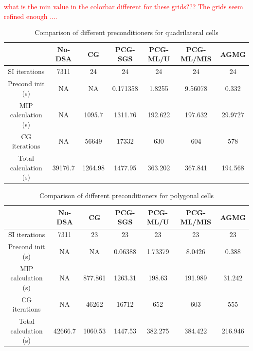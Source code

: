 %
\textcolor{red}{what is the min value in the colorbar different for these grids??? The grids seem refined enough ....}
\begin{table}[!htbp]
  \begin{center}
    \caption{Comparison of different preconditioners for quadrilateral cells}
    \begin{tabular}{|c|c|c|c|c|c|c|}
      \hline
      & No-DSA & CG & PCG-SGS & PCG-ML/U & PCG-ML/MIS & AGMG \\
      \hline
      SI iterations   & 7311    & 24      & 24       & 24      & 24      & 24 \\
   Precond init (s)   & NA      & NA      & 0.171358 & 1.8255  & 9.56078 & 0.332 \\
MIP calculation (s)   & NA      & 1095.7  & 1311.76  & 192.622 & 197.632 & 29.9727 \\
      CG iterations   & NA      & 56649   & 17332    & 630     & 604     & 578 \\
Total calculation (s) & 39176.7 & 1264.98 & 1477.95  & 363.202 & 367.841 &
      194.568 \\
      \hline
    \end{tabular}
    \label{comparison_homog_quad}
  \end{center}
\end{table}
%
\begin{table}[!htbp]
  \begin{center}
    \caption{Comparison of different preconditioners for polygonal cells}
    \begin{tabular}{|c|c|c|c|c|c|c|}
      \hline
      & No-DSA & CG & PCG-SGS & PCG-ML/U & PCG-ML/MIS & AGMG \\
      \hline
      SI iterations   & 7311    & 23      & 23      & 23      & 23      & 23 \\
   Precond init (s)   & NA      & NA      & 0.06388 & 1.73379 & 8.0426  & 0.388 \\
MIP calculation (s)   & NA      & 877.861 & 1263.31 & 198.63  & 191.989 &
      31.242 \\
      CG iterations   & NA      & 46262   & 16712   & 652     & 603     & 555 \\
Total calculation (s) & 42666.7 & 1060.53 & 1447.53 & 382.275 & 384.422 &
      216.946 \\
      \hline
    \end{tabular}
    \label{comparison_homog_poly}
  \end{center}
\end{table}

